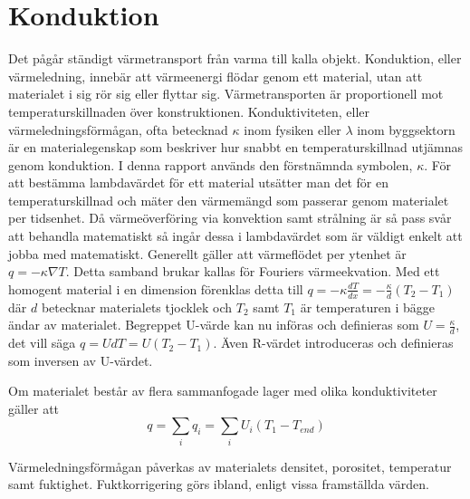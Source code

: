 \section{Konduktion}\label{sec:heatconduction}

Det pågår ständigt värmetransport från varma till kalla objekt. Konduktion, eller värmeledning, innebär att värmeenergi flödar genom ett material, utan att materialet i sig rör sig eller flyttar sig. Värmetransporten är proportionell mot temperaturskillnaden över konstruktionen. Konduktiviteten, eller värmeledningsförmågan, ofta betecknad $\kappa$ inom fysiken eller $\lambda$ inom byggsektorn är en materialegenskap som beskriver hur snabbt en temperaturskillnad utjämnas genom konduktion. I denna rapport används den förstnämnda symbolen, $\kappa$. För att bestämma lambdavärdet för ett material utsätter man det för en temperaturskillnad och mäter den värmemängd som passerar genom materialet per tidsenhet. Då värmeöverföring via konvektion samt strålning är så pass svår att behandla matematiskt så ingår dessa i lambdavärdet som är väldigt enkelt att jobba med matematiskt. Generellt gäller att värmeflödet per ytenhet är $q = - \kappa \nabla T$. Detta samband brukar kallas för Fouriers värmeekvation. Med ett homogent material i en dimension förenklas detta till $q = -\kappa \frac{dT}{dx} = -\frac{\kappa}{d}\left( T_2-T_1\right)$ där $d$ betecknar materialets tjocklek och $T_2$ samt $T_1$ är temperaturen i bägge ändar av materialet. Begreppet U-värde kan nu införas och definieras som $U = \frac{\kappa}{d}$, det vill säga $q = UdT = U\left( T_2-T_1 \right)$. Även R-värdet introduceras och definieras som inversen av U-värdet.

Om materialet består av flera sammanfogade lager med olika konduktiviteter gäller att
\begin{equation}
q = \sum_i q_i = \sum_i U_i \left( T_{1} - T_{end}\right)
\end{equation} 

Värmeledningsförmågan påverkas av materialets densitet, porositet, temperatur samt fuktighet. Fuktkorrigering görs ibland, enligt vissa framställda värden.
